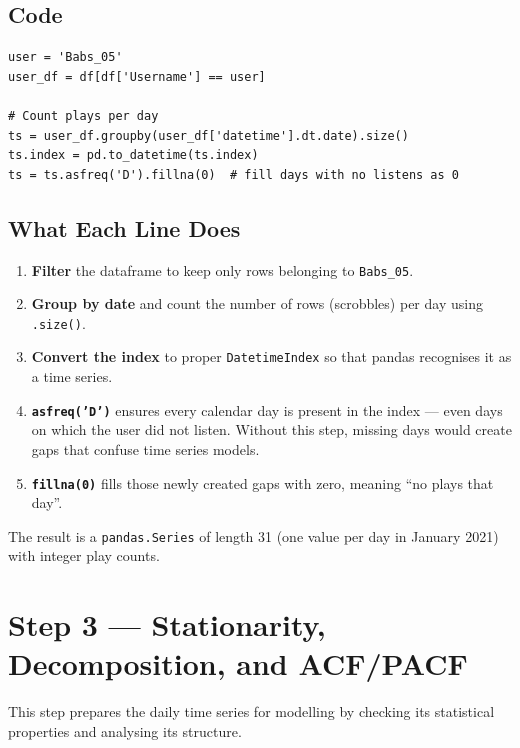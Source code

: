 \documentclass[12pt, a4paper]{article}
\begin{document}
\subsection{Code}

\begin{lstlisting}
user = 'Babs_05'
user_df = df[df['Username'] == user]

# Count plays per day
ts = user_df.groupby(user_df['datetime'].dt.date).size()
ts.index = pd.to_datetime(ts.index)
ts = ts.asfreq('D').fillna(0)  # fill days with no listens as 0
\end{lstlisting}

\subsection{What Each Line Does}

\begin{enumerate}
    \item \textbf{Filter} the dataframe to keep only rows belonging to
          \texttt{Babs\_05}.
    \item \textbf{Group by date} and count the number of rows (scrobbles)
          per day using \texttt{.size()}.
    \item \textbf{Convert the index} to proper \texttt{DatetimeIndex} so
          that pandas recognises it as a time series.
    \item \textbf{\texttt{asfreq('D')}} ensures every calendar day is
          present in the index --- even days on which the user did not listen.
          Without this step, missing days would create gaps that confuse
          time series models.
    \item \textbf{\texttt{fillna(0)}} fills those newly created gaps with
          zero, meaning ``no plays that day''.
\end{enumerate}

The result is a \texttt{pandas.Series} of length 31 (one value per day in
January 2021) with integer play counts.

\section{Step 3 --- Stationarity, Decomposition, and ACF/PACF}

This step prepares the daily time series for modelling by checking its
statistical properties and analysing its structure.
\end{document}
